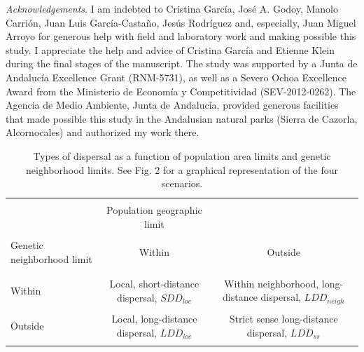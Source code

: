 \documentclass[a4paper, 12pt]{article}
\begin{document}
\begin{linenumbers}
\emph{Acknowledgements}. I am indebted to Cristina García, José A. Godoy, Manolo Carrión, Juan Luis García-Castaño, Jesús Rodríguez and, especially, Juan Miguel Arroyo for generous help with field and laboratory work and making possible this study. I appreciate the help and advice of Cristina García and Etienne Klein during the final stages of the manuscript. The study was supported by a Junta de Andalucía Excellence Grant (RNM-5731), as well as a Severo Ochoa Excellence Award from the Ministerio de Economía y Competitividad (SEV-2012-0262). The Agencia de Medio Ambiente, Junta de Andalucía, provided generous facilities that made possible this study in the Andalusian natural parks (Sierra de Cazorla, Alcornocales) and authorized my work there.

\end{linenumbers}

\newpage




\newpage

\pagestyle{empty}
\begin{landscape}
	\headheight     3cm
\begin{table}
\captionsetup{width=20cm}%
\caption{Types of dispersal as a function of population area limits and genetic neighborhood limits. See Fig. 2 for a graphical representation of the four scenarios.}
\vspace{0.5cm}
  \begin{tabular}{lcc}
    \hline
\\&Population geographic limit    &  \\\\
Genetic neighborhood limit     &Within &Outside \\\\
    \hline
\\Within  &  Local, short-distance dispersal, $SDD_{loc}$  
          &  Within neighborhood, long-distance dispersal, $LDD_{neigh}$ \\\\
Outside   &     Local, long-distance dispersal, $LDD_{loc}$    
          &  Strict sense long-distance dispersal, $LDD_{ss}$\\\\ 
    \hline
  \end{tabular}
\end{table}
\end{landscape}
\end{document}
